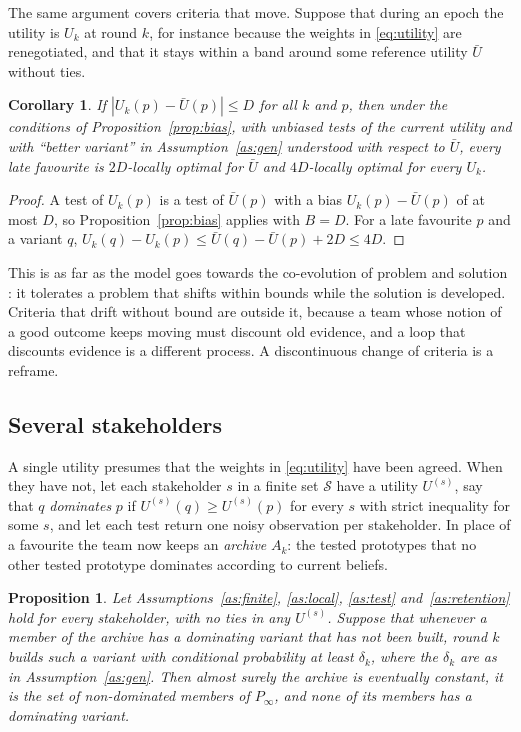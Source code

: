 \documentclass[10pt,twocolumn]{article}
\newtheorem{proposition}{Proposition}
\newtheorem{corollary}{Corollary}
\theoremstyle{definition}
\begin{document}
The same argument covers criteria that move. Suppose that during an epoch the utility is $U_k$ at round $k$, for instance because the weights in \eqref{eq:utility} are renegotiated, and that it stays within a band around some reference utility $\bar U$ without ties.

\begin{corollary}
\label{cor:drift}
If $|U_k(p)-\bar U(p)|\le D$ for all $k$ and $p$, then under the conditions of Proposition~\ref{prop:bias}, with unbiased tests of the current utility and with ``better variant'' in Assumption~\ref{as:gen} understood with respect to $\bar U$, every late favourite is $2D$-locally optimal for $\bar U$ and $4D$-locally optimal for every $U_k$.
\end{corollary}

\begin{proof}
A test of $U_k(p)$ is a test of $\bar U(p)$ with a bias $U_k(p)-\bar U(p)$ of at most $D$, so Proposition~\ref{prop:bias} applies with $B=D$. For a late favourite $p$ and a variant $q$, $U_k(q)-U_k(p)\le\bar U(q)-\bar U(p)+2D\le4D$.
\end{proof}

This is as far as the model goes towards the co-evolution of problem and solution \citep{dorstcross2001}: it tolerates a problem that shifts within bounds while the solution is developed. Criteria that drift without bound are outside it, because a team whose notion of a good outcome keeps moving must discount old evidence, and a loop that discounts evidence is a different process. A discontinuous change of criteria is a reframe.

\subsection{Several stakeholders}
\label{sec:pareto}

A single utility presumes that the weights in \eqref{eq:utility} have been agreed. When they have not, let each stakeholder $s$ in a finite set $\mathcal S$ have a utility $U^{(s)}$, say that $q$ \emph{dominates} $p$ if $U^{(s)}(q)\ge U^{(s)}(p)$ for every $s$ with strict inequality for some $s$, and let each test return one noisy observation per stakeholder. In place of a favourite the team now keeps an \emph{archive} $A_k$: the tested prototypes that no other tested prototype dominates according to current beliefs.

\begin{proposition}
\label{prop:pareto}
Let Assumptions~\ref{as:finite}, \ref{as:local}, \ref{as:test} and~\ref{as:retention} hold for every stakeholder, with no ties in any $U^{(s)}$. Suppose that whenever a member of the archive has a dominating variant that has not been built, round $k$ builds such a variant with conditional probability at least $\delta_k$, where the $\delta_k$ are as in Assumption~\ref{as:gen}. Then almost surely the archive is eventually constant, it is the set of non-dominated members of $P_\infty$, and none of its members has a dominating variant.
\end{proposition}
\end{document}
